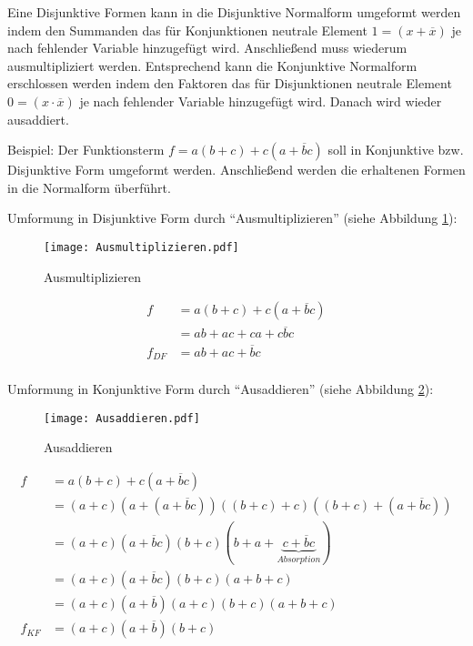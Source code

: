 Eine Disjunktive Formen kann in die Disjunktive Normalform umgeformt werden indem den Summanden das für Konjunktionen neutrale Element $1 = (x + \overline{x})$ je nach fehlender Variable hinzugefügt wird. Anschließend muss wiederum ausmultipliziert werden. Entsprechend kann die Konjunktive Normalform erschlossen werden indem den Faktoren das für Disjunktionen neutrale Element $0 = (x \cdot \overline{x})$ je nach fehlender Variable hinzugefügt wird. Danach wird wieder ausaddiert.

Beispiel: Der Funktionsterm $f = a(b + c) + c(a + \overline{b}c)$ soll in Konjunktive bzw. Disjunktive Form umgeformt werden. Anschließend werden die erhaltenen Formen in die Normalform überführt.

Umformung in Disjunktive Form durch "`Ausmultiplizieren"' (siehe Abbildung \ref{Ausmultiplizieren}):

\begin{figure}[htbp] %
	\centering
	\texttt{[image: Ausmultiplizieren.pdf]}
	\caption{Ausmultiplizieren}
	\label{Ausmultiplizieren}
\end{figure}
\begin{align*}
				  f &= a(b + c) + c(a + \overline{b}c) \\
					&= ab + ac + ca + c\overline{b}c   \\
	f_{\textit{DF}} &= ab + ac + \overline{b}c    \\
\end{align*}

Umformung in Konjunktive Form durch "`Ausaddieren"' (siehe Abbildung \ref{Ausaddieren}):

\begin{figure}[htbp] %
	\centering
	\texttt{[image: Ausaddieren.pdf]}
	\caption{Ausaddieren}
	\label{Ausaddieren}
\end{figure}

\begin{align*}
				  f &= a(b + c) + c(a + \overline{b}c)                \\
					&= (a + c) (a + (a + \overline{b}c))
						((b + c) + c) ((b + c) + (a + \overline{b}c)) \\
	                &= (a + c) (a + \overline{b}c)
					   (b + c) (b + a 
					   + \underbrace{c + \overline{b}c}_{Absorption}) \\
	                &= (a + c) (a + \overline{b}c) (b + c) (a + b + c) \\
	                &= (a + c) (a + \overline{b}) (a + c) 
	                   (b + c) (a + b + c) \\
	f_{\textit{KF}} &= (a + c) (a + \overline{b}) (b + c) \\
\end{align*}

